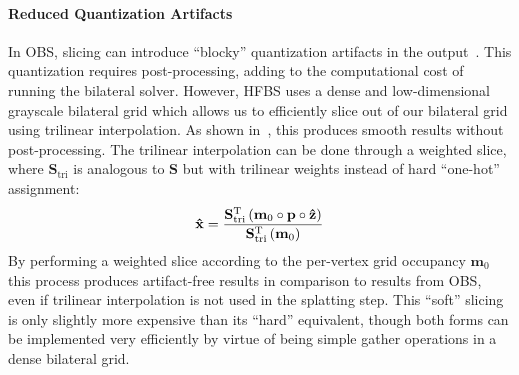 \paragraph{Reduced Quantization Artifacts}
In OBS, slicing can
 introduce ``blocky'' quantization artifacts in the output~\cite{BarronPoole2016}.
This quantization requires post-processing, adding to the computational cost
of running the bilateral solver.
However, HFBS uses a dense and low-dimensional grayscale bilateral grid
which allows us to efficiently slice out of our bilateral grid using trilinear
interpolation. As shown in~\cite{Chen2007}, this produces smooth results
without post-processing. The trilinear interpolation can be done through a weighted slice, where
$\mathbf{S}_{\mathrm{tri}}$ is analogous to $\mathbf{S}$ but with trilinear
weights instead of hard ``one-hot'' assignment:
\begin{equation*}
\mathbf{\hat x} = { \mathbf{S}_{\mathrm{tri}}^\mathrm{T} \left( \mathbf{m}_0 \circ \mathbf{p} \circ \mathbf{\hat z} \right) \over \mathbf{S}_{\mathrm{tri}}^\mathrm{T} \left( \mathbf{m}_0 \right)} \label{eq:soft_slice}
\end{equation*}
By performing a weighted slice according to the per-vertex grid occupancy
$\mathbf{m}_0$ this process produces artifact-free results in comparison to results from OBS, even if trilinear
interpolation is not used in the splatting step. This ``soft'' slicing is only
slightly more expensive than its ``hard'' equivalent, though both forms can be
implemented very efficiently by virtue of being simple gather operations in a
dense bilateral grid.



